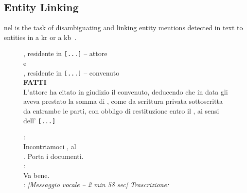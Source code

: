 \subsection{Entity Linking}
\label{sec:rw:nel}
\begin{definition}
    \Acf{nel} is the task of disambiguating and linking entity mentions detected in text to entities in a \acf{kr} or a \ac{kb}~\cite{entityorientedsearch2018balog,jm3}.
\end{definition}

\begin{figure}[htbp]
\centering
\begin{minipage}[t]{0.48\linewidth}
\small
\raggedright
{}
, residente in  \texttt{[...]} -- attore\\
e\\
, residente in  \texttt{[...]} -- convenuto\\
\textbf{FATTI}\\
L'attore ha citato in giudizio il convenuto, deducendo che in data  gli aveva prestato la somma di , come da scrittura privata sottoscritta da entrambe le parti, con obbligo di restituzione entro il , ai sensi dell' \texttt{[...]}
\label{fig:extract-nel-judgment}
\end{minipage}
\hfill
\begin{minipage}[t]{0.48\linewidth}
\small
\raggedright
\NELDate{[25/04/22 -- 11:45]}%
:\\
\quad Incontriamoci , al\\
\quad {}. Porta i documenti.\\[0.5em]
\NELDate{[2025/04/22 -- 11:46]} :\\
\quad Va bene.\\[0.5em]
\NELDate{[2025/04/22 -- 18:51]}%
: \textit{[Messaggio vocale -- 2 min 58 sec]} \textit{Trascrizione:}\\

\end{minipage}
\end{figure}
